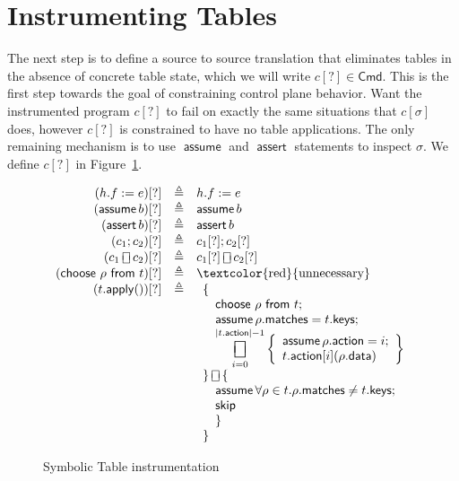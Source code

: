 \documentclass{article}
\newcommand{\Cmd}{\mathsf{Cmd}}
\newcommand{\matches}{\mathsf{matches}}
\newcommand{\action}{\mathsf{action}}
\newcommand{\keys}{\mathsf{keys}}
\newcommand{\data}{\mathsf{data}}
\newcommand{\assert}{\mathop{\mathsf{assert}}}
\newcommand{\assume}{\mathop{\mathsf{assume}}}
\newcommand{\apply}{\mathsf{apply}}
\newcommand{\choiceop}{\rotatebox[origin=c]{90}{$\sqsubset\!\!\!\sqsupset$}}
\newcommand{\choice}{\mathbin{\choiceop}}
\DeclareMathOperator*{\bigchoice}{\scalerel*{\choiceop}{\sum}}
\renewcommand{\choose}[2]{\mathsf{choose}~#1~\mathsf{from}~#2}
\newcommand{\SKIP}{\mathsf{skip}}
\begin{document}
\section{Instrumenting Tables}

The next step is to define a source to source translation that eliminates tables
in the absence of concrete table state, which we will write $c[?] \in \Cmd$.
This is the first step towards the goal of constraining control plane behavior.
Want the instrumented program $c[?]$ to fail on exactly the same situations that
$c[\sigma]$ does, however $c[?]$ is constrained to have no table applications.
The only remaining mechanism is to use $\assume$ and $\assert$ statements to
inspect $\sigma$. We define $c[?]$ in Figure~\ref{fig:table-instrument}.


\begin{figure}[htp]
  \[\begin{array}{r >{\triangleq}cl}
  (h.f := e)[?] && h.f := e \\
  (\assume b)[?] && \assume b \\
  (\assert b)[?] && \assert b\\
  (c_1;c_2)[?] && c_1[?];c_2[?]\\
  (c_1 \choice c_2)[?] && c_1[?] \choice c_2[?]\\
  (\choose \rho t)[?] &&
  \textrm{\textcolor{red}{unnecessary}} \\
  (t.\apply())[?] &&
  \begin{array}[t]{l} \displaystyle
    \{ \\
    \quad \choose \rho t; \\
    \quad \assume \rho.\matches = t.\keys; \\
    \quad \displaystyle \bigchoice_{i=0}^{|t.\action| -1}
    \left\{\begin{array}{l}
    \assume \rho.\action = i;\\
    t.\action[i](\rho.\data)
    \end{array}\right\}\\
    \} \choice \{ \\
    \quad \assume \forall \rho \in t. \rho.\matches \neq t.\keys; \\
    \quad \SKIP \\
    \quad \}\\
    \}
  \end{array}
  \end{array}
  \]
  \caption{Symbolic Table instrumentation}
  \label{fig:table-instrument}
\end{figure}
\end{document}
